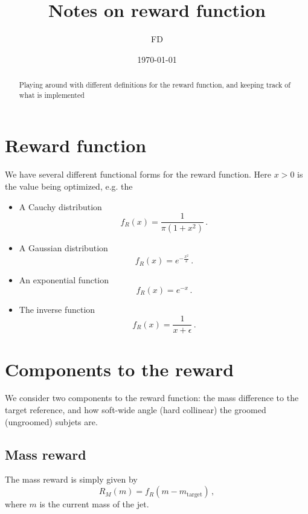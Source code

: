 \documentclass[12pt,twoside]{article}
\begin{document}
\title{Notes on reward function}
\date{\today}
\author{FD}
\maketitle
\begin{abstract}
  Playing around with different definitions for the reward function,
  and keeping track of what is implemented
\end{abstract}


\section{Reward function}
We have several different functional forms for the reward function.
Here $x>0$ is the value being optimized, e.g. the
\begin{itemize}
\item A Cauchy distribution
  \begin{equation}
    \label{eq:cauchy-reward}
    f_R(x) = \frac{1}{\pi(1 + x^2)}\,.
  \end{equation}
\item A Gaussian distribution
  \begin{equation}
    \label{eq:gauss-reward}
    f_R(x) = e^{-\tfrac{x^2}{2}}\,.
  \end{equation}
\item An exponential function
  \begin{equation}
    \label{eq:exp-reward}
    f_R(x) = e^{-x}\,.
  \end{equation}
\item The inverse function
  \begin{equation}
    \label{eq:inv-reward}
    f_R(x) = \frac{1}{x+\epsilon}\,.
  \end{equation}
\end{itemize}

\section{Components to the reward}
We consider two components to the reward function: the mass difference
to the target reference, and how soft-wide angle (hard collinear) the
groomed (ungroomed) subjets are.

\subsection{Mass reward}
The mass reward is simply given by
\begin{equation}
  \label{eq:mass-reward}
  R_M(m) = f_R(m - m_\text{target})\,,
\end{equation}
where $m$ is the current mass of the jet.
\end{document}
